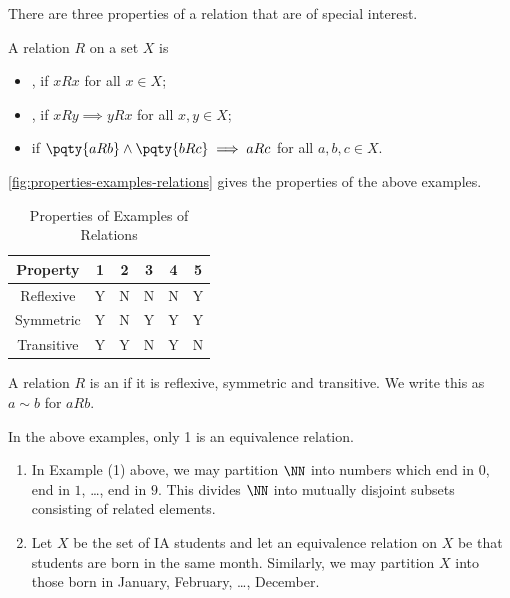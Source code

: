 There are three properties of a relation that are of special interest.

\begin{definition}
    A relation \(R\) on a set \(X\) is
    \begin{itemize}
        \item {}, if \(xRx\) for all \(x \in X\);
        \item {}, if \(xRy \implies yRx\) for all \(x, y \in X\);
        \item {} if \(\pqty{aRb} \land \pqty{bRc} \implies aRc\) for all \(a, b, c \in X\).
    \end{itemize}
\end{definition}

\begin{examples}
    \autoref{fig:properties-examples-relations} gives the properties of the above examples.
\end{examples}

\begin{table}[ht!]
    \centering
    \begin{tabular}{c|ccccc}
        Property & 1 & 2 & 3 & 4 & 5 \\
        \hline
        Reflexive  & Y & N & N & N & Y \\
        Symmetric  & Y & N & Y & Y & Y \\
        Transitive & Y & Y & N & Y & N
    \end{tabular}
    \caption{Properties of Examples of Relations}
    \label{fig:properties-examples-relations}
\end{table}

\begin{definition}
    A relation \(R\) is an  if it is reflexive, symmetric and transitive. We write this as \(a \sim b\) for \(a R b\).
\end{definition}

In the above examples, only 1 is an equivalence relation.

\begin{examples}
    \begin{enumerate}
        \item In Example (1) above, we may partition \(\NN\) into numbers which end in \(0\), end in \(1\), \dots, end in \(9\). This divides \(\NN\) into mutually disjoint subsets consisting of related elements.
        \item Let \(X\) be the set of IA students and let an equivalence relation on \(X\) be that students are born in the same month. Similarly, we may partition \(X\) into those born in January, February, \dots, December.
    \end{enumerate}
\end{examples}


